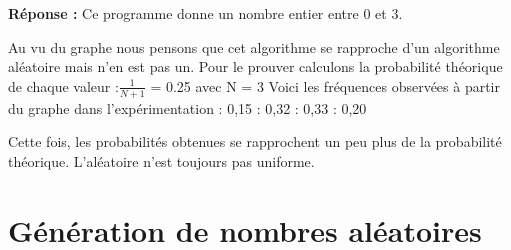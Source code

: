 \documentclass[oneside]{book}
\begin{document}
\textbf{Réponse :} \newline
Ce programme donne un nombre entier entre 0 et 3.

Au vu du graphe nous pensons que cet algorithme se rapproche d'un algorithme aléatoire mais n'en est pas un. Pour le prouver calculons la probabilité théorique de chaque valeur :\newline \newline $\frac{1}{N+1}$ = 0.25 avec N = 3 \newline \newline
Voici les fréquences observées à partir du graphe dans l'expérimentation  : 0,15  : 0,32  : 0,33  : 0,20 \newline

Cette fois, les probabilités obtenues se rapprochent un peu plus de la probabilité théorique. L'aléatoire n'est toujours pas uniforme.
\section{Génération de nombres aléatoires}
\end{document}
